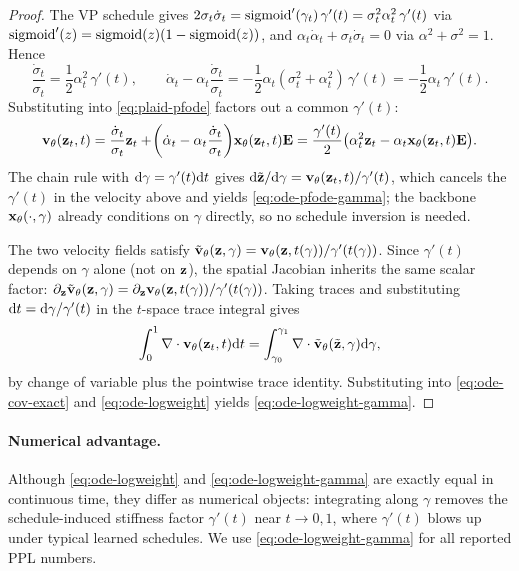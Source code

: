 \documentclass{article}
\begin{document}
\begin{proof}
The VP schedule gives $2\sigma_t\dot\sigma_t = \operatorname{sigmoid}'(\gamma_t)\,\gamma'(t) = \sigma_t^2\alpha_t^2\,\gamma'(t)$ via $\operatorname{sigmoid}'(z) = \operatorname{sigmoid}(z)(1-\operatorname{sigmoid}(z))$, and $\alpha_t\dot\alpha_t + \sigma_t\dot\sigma_t = 0$ via $\alpha^2+\sigma^2=1$. Hence
\begin{equation*}
  \frac{\dot\sigma_t}{\sigma_t} = \frac{1}{2}\alpha_t^2\,\gamma'(t), \qquad \dot\alpha_t - \alpha_t\frac{\dot\sigma_t}{\sigma_t} = -\frac{1}{2}\alpha_t(\sigma_t^2 + \alpha_t^2)\,\gamma'(t) = -\frac{1}{2}\alpha_t\,\gamma'(t).
\end{equation*}
Substituting into \cref{eq:plaid-pfode} factors out a common $\gamma'(t)$:
\begin{equation*}
  {\mathbf v}_\theta({\mathbf z}_t,t) = \frac{\dot\sigma_t}{\sigma_t}{\mathbf z}_t + \!\left(\dot\alpha_t - \alpha_t\frac{\dot\sigma_t}{\sigma_t}\right)\!{\mathbf x}_\theta({\mathbf z}_t,t){\mathbf E} = \frac{\gamma'(t)}{2}\bigl(\alpha_t^2{\mathbf z}_t - \alpha_t{\mathbf x}_\theta({\mathbf z}_t,t){\mathbf E}\bigr).
\end{equation*}
The chain rule with ${\mathrm{d}}\gamma = \gamma'(t){\mathrm{d}} t$ gives ${\mathrm{d}}\tilde{{\mathbf z}}/{\mathrm{d}}\gamma = {\mathbf v}_\theta({\mathbf z}_t,t)/\gamma'(t)$, which cancels the $\gamma'(t)$ in the velocity above and yields \cref{eq:ode-pfode-gamma}; the backbone ${\mathbf x}_\theta(\cdot,\gamma)$ already conditions on $\gamma$ directly, so no schedule inversion is needed.

The two velocity fields satisfy $\tilde{{\mathbf v}}_\theta({\mathbf z},\gamma) = {\mathbf v}_\theta({\mathbf z},t(\gamma))/\gamma'(t(\gamma))$. Since $\gamma'(t)$ depends on $\gamma$ alone (not on ${\mathbf z}$), the spatial Jacobian inherits the same scalar factor: $\partial_{\mathbf z}\tilde{{\mathbf v}}_\theta({\mathbf z},\gamma) = \partial_{\mathbf z}{\mathbf v}_\theta({\mathbf z},t(\gamma))/\gamma'(t(\gamma))$. Taking traces and substituting ${\mathrm{d}} t = {\mathrm{d}}\gamma/\gamma'(t)$ in the $t$-space trace integral gives
\begin{equation}\label{eq:ode-trace-invariant}
  \int_0^1 \nabla\cdot{\mathbf v}_\theta({\mathbf z}_t,t){\mathrm{d}} t = \int_{\gamma_0}^{\gamma_1} \nabla\cdot\tilde{{\mathbf v}}_\theta(\tilde{{\mathbf z}},\gamma){\mathrm{d}}\gamma,
\end{equation}
by change of variable plus the pointwise trace identity. Substituting into \cref{eq:ode-cov-exact} and \cref{eq:ode-logweight} yields \cref{eq:ode-logweight-gamma}.
\end{proof}

\paragraph{Numerical advantage.} Although \cref{eq:ode-logweight} and \cref{eq:ode-logweight-gamma} are exactly equal in continuous time, they differ as numerical objects: integrating along $\gamma$ removes the schedule-induced stiffness factor $\gamma'(t)$ near $t \to 0, 1$, where $\gamma'(t)$ blows up under typical learned schedules. We use \cref{eq:ode-logweight-gamma} for all reported PPL numbers.
\end{document}
